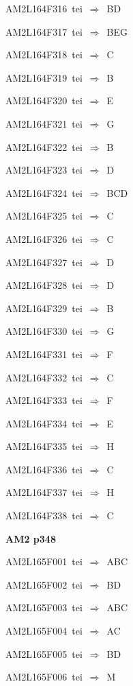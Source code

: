 {\sixrm AM2L164F316\ {\sixit tei}\ }$\Rightarrow$\ BD\par\smallskip
{\sixrm AM2L164F317\ {\sixit tei}\ }$\Rightarrow$\ BEG\par\smallskip
{\sixrm AM2L164F318\ {\sixit tei}\ }$\Rightarrow$\ C\par\smallskip
{\sixrm AM2L164F319\ {\sixit tei}\ }$\Rightarrow$\ B\par\smallskip
{\sixrm AM2L164F320\ {\sixit tei}\ }$\Rightarrow$\ E\par\smallskip
{\sixrm AM2L164F321\ {\sixit tei}\ }$\Rightarrow$\ G\par\smallskip
{\sixrm AM2L164F322\ {\sixit tei}\ }$\Rightarrow$\ B\par\smallskip
{\sixrm AM2L164F323\ {\sixit tei}\ }$\Rightarrow$\ D\par\smallskip
{\sixrm AM2L164F324\ {\sixit tei}\ }$\Rightarrow$\ BCD\par\smallskip
{\sixrm AM2L164F325\ {\sixit tei}\ }$\Rightarrow$\ C\par\smallskip
{\sixrm AM2L164F326\ {\sixit tei}\ }$\Rightarrow$\ C\par\smallskip
{\sixrm AM2L164F327\ {\sixit tei}\ }$\Rightarrow$\ D\par\smallskip
{\sixrm AM2L164F328\ {\sixit tei}\ }$\Rightarrow$\ D\par\smallskip
{\sixrm AM2L164F329\ {\sixit tei}\ }$\Rightarrow$\ B\par\smallskip
{\sixrm AM2L164F330\ {\sixit tei}\ }$\Rightarrow$\ G\par\smallskip
{\sixrm AM2L164F331\ {\sixit tei}\ }$\Rightarrow$\ F\par\smallskip
{\sixrm AM2L164F332\ {\sixit tei}\ }$\Rightarrow$\ C\par\smallskip
{\sixrm AM2L164F333\ {\sixit tei}\ }$\Rightarrow$\ F\par\smallskip
{\sixrm AM2L164F334\ {\sixit tei}\ }$\Rightarrow$\ E\par\smallskip
{\sixrm AM2L164F335\ {\sixit tei}\ }$\Rightarrow$\ H\par\smallskip
{\sixrm AM2L164F336\ {\sixit tei}\ }$\Rightarrow$\ C\par\smallskip
{\sixrm AM2L164F337\ {\sixit tei}\ }$\Rightarrow$\ H\par\smallskip
{\sixrm AM2L164F338\ {\sixit tei}\ }$\Rightarrow$\ C\par\smallskip

\par\vfill\eject
{\bf\hfill AM2 p348\hfill\hbox{}}\par\bigskip
{\sixrm AM2L165F001\ {\sixit tei}\ }$\Rightarrow$\ ABC\par\smallskip
{\sixrm AM2L165F002\ {\sixit tei}\ }$\Rightarrow$\ BD\par\smallskip
{\sixrm AM2L165F003\ {\sixit tei}\ }$\Rightarrow$\ ABC\par\smallskip
{\sixrm AM2L165F004\ {\sixit tei}\ }$\Rightarrow$\ AC\par\smallskip
{\sixrm AM2L165F005\ {\sixit tei}\ }$\Rightarrow$\ BD\par\smallskip
{\sixrm AM2L165F006\ {\sixit tei}\ }$\Rightarrow$\ M\par\smallskip

